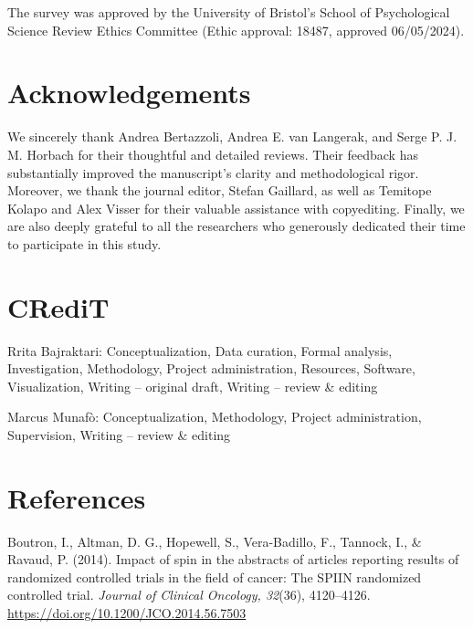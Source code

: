 \documentclass[authordate, meta]{jote-new-article}
\begin{document}
	The survey was approved by the University of Bristol's School of Psychological Science Review Ethics Committee (Ethic approval: 18487, approved 06/05/2024).



	\section{\textbf{Acknowledgements}}



	We sincerely thank Andrea Bertazzoli, Andrea E. van Langerak, and Serge P. J. M. Horbach for their thoughtful and detailed reviews. Their feedback has substantially improved the manuscript's clarity and methodological rigor. Moreover, we thank the journal editor, Stefan Gaillard, as well as Temitope Kolapo and Alex Visser for their valuable assistance with copyediting. Finally, we are also deeply grateful to all the researchers who generously dedicated their time to participate in this study.



	\section{\textbf{CRediT}}



	Rrita Bajraktari: Conceptualization, Data curation, Formal analysis, Investigation, Methodology, Project administration, Resources, Software, Visualization, Writing -- original draft, Writing -- review \& editing



	Marcus Munafò: Conceptualization, Methodology, Project administration, Supervision, Writing -- review \& editing







	\section{References}



	Boutron, I., Altman, D. G., Hopewell, S., Vera-Badillo, F., Tannock, I., \& Ravaud, P. (2014). Impact of spin in the abstracts of articles reporting results of randomized controlled trials in the field of cancer: The SPIIN randomized controlled trial. \emph{Journal of Clinical Oncology, 32}(36), 4120--4126. \url{https://doi.org/10.1200/JCO.2014.56.7503}
\end{document}

